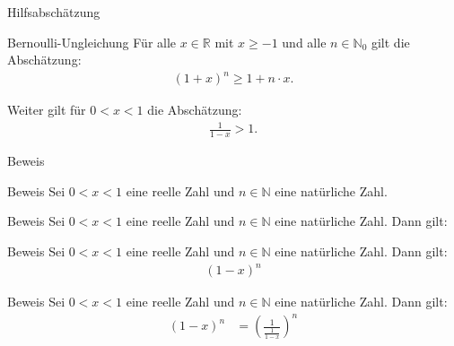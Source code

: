 \documentclass[10pt]{beamer}
\def\bN{\mathbb{N}}
\def\bR{\mathbb{R}}
\begin{document}
\begin{frame}{Hilfsabschätzung}
    \begin{block}{Bernoulli-Ungleichung}
        Für alle \( x \in \bR \) mit \( x \geq - 1 \) und alle \( n \in \bN_{0} \) gilt die Abschätzung:
        \begin{align*}
            \left( 1 + x \right)^{n}
            \geq 1 + n \cdot x.
        \end{align*}
    \end{block}
    Weiter gilt für  \( 0 < x < 1 \) die Abschätzung:
    \begin{align*}
        \frac{1}{1 - x} 
        > 1.
    \end{align*}
\end{frame}



\begin{frame}{Beweis}
    
\end{frame}



\begin{frame}{Beweis}
    Sei \( 0 < x < 1 \) eine reelle Zahl und \( n \in \bN \) eine natürliche Zahl.
\end{frame}



\begin{frame}{Beweis}
    Sei \( 0 < x < 1 \) eine reelle Zahl und \( n \in \bN \) eine natürliche Zahl. Dann gilt:
\end{frame}



\begin{frame}{Beweis}
    Sei \( 0 < x < 1 \) eine reelle Zahl und \( n \in \bN \) eine natürliche Zahl. Dann gilt:
    \begin{align*}
        \left( 1 - x \right)^{n}
    \end{align*}
\end{frame}



\begin{frame}{Beweis}
    Sei \( 0 < x < 1 \) eine reelle Zahl und \( n \in \bN \) eine natürliche Zahl. Dann gilt:
    \begin{align*}
        \left( 1 - x \right)^{n}
        & = \left( \frac{1}{\frac{1}{1 - x}} \right)^{n}
    \end{align*}
\end{frame}
\end{document}
